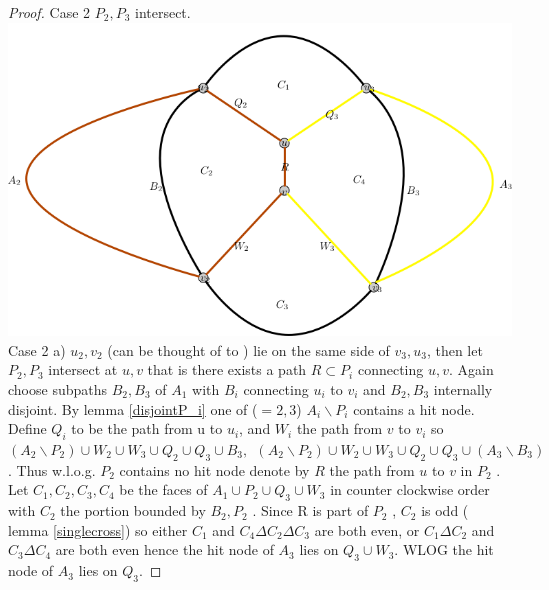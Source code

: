 \documentclass[letterpaper,11pt]{article}
\newcommand{\0}{\mathbb{0}}
\newcommand{\1}{\mathbb{1}}
\begin{document}
\begin{proof}
Case 2 $P_2,P_3$  intersect.  \\
\includegraphics[scale=0.3]{Cross.png}
Case 2 a)  $ u_2, v_2 $ (can be thought of to ) lie on the same side of $v_3, u_3 $, then let $P_2, P_3 $ intersect at $u,v$ that is there exists   a path  $ R \subset P_i$  connecting $u, v$. Again choose subpaths $B_2,B_3$ of  $A_1$ with  $B_i$ connecting $u_i$ to $v_i$ and $B_2,B_3$ internally disjoint. 
By lemma \ref{disjointP_i} one of ($=2,3$) $A_i \backslash P_i$ contains a hit node.
Define $Q_i$ to be the path from u to $u_i$,  and  $W_i$ the path from $v$ to $v_i$    so $  (A_2 \backslash P_2  ) \cup W_2 \cup W_3 \cup Q_2 \cup Q_3 \cup B_3   , \ \ (A_2 \backslash P_2  ) \cup W_2 \cup W_3 \cup Q_2 \cup Q_3 \cup (A_3 \backslash B_3 ) $ . 
Thus w.l.o.g.  $P_2 $ contains no hit node denote by $R$ the path from $u$ to $v$ in $P_2$ .
Let $ C_1 , C_2, C_3, C_4 $ be the faces of  $A_1 \cup P_2 \cup Q_3 \cup W_3 $ in counter clockwise order with  $C_2$ the portion bounded by $B_2, P_2$ . Since R is part of $P_2$  ,  $C_2$ is odd ( lemma \ref{singlecross}) so either  $ C_1 $  and $   C_4 \Delta  C_2  \Delta C_3 $  are both even, or  $C_1 \Delta C_2$  and $C_3  \Delta  C_4 $ are both even hence the hit node of $A_3$ lies on $Q_3 \cup W_3 $.   WLOG the hit node of $A_3$ lies on $Q_3$.  

\end{proof}
\end{document}
